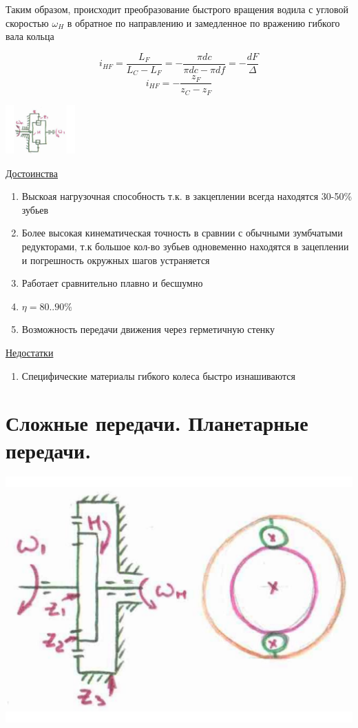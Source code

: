 \documentclass{article}
\begin{document}
Таким образом, происходит преобразование быстрого вращения водила с угловой скоростью $\omega_H$ в обратное по направлению и замедленное по вражению гибкого вала кольца

$$
i_{HF} = \frac{L_F}{L_C - L_F}  = - \frac{\pi dc}{\pi dc - \pi df} = - \frac{dF}{ \Delta} 
$$
$$
i_{HF} = - \frac{z_F}{z_C - z_F} 
$$

\includegraphics[width = 0.2\textwidth]{15_2}

\underline{Достоинства} 
\begin{enumerate}
	\item Выскоая нагрузочная способность т.к. в закцеплении всегда находятся 30-50\% зубьев
	\item Более высокая кинематическая точность в сравнии с обычными зумбчатыми редукторами, т.к большое кол-во зубьев одновеменно находятся в зацеплении и погрешность окружных шагов устраняется
	\item Работает сравнительно плавно и бесшумно
	\item $\eta = 80 .. 90 \%$
	\item Возможность передачи движения через герметичную стенку
\end{enumerate}
\underline{Недостатки}
\begin{enumerate}
	\item Специфические материалы гибкого колеса быстро изнашиваются
\end{enumerate}

\section {Сложные передачи. Планетарные передачи.}

\includegraphics[width = \textwidth]{16_1}
\end{document}
